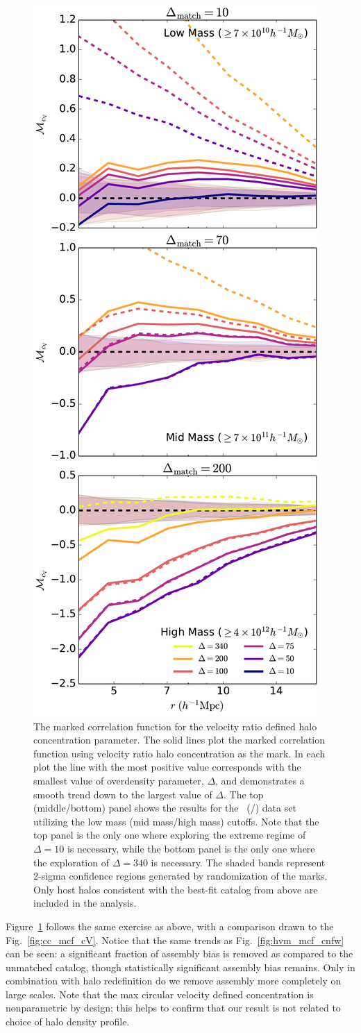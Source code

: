 \documentclass[usenatbib]{mnras}
\begin{document}
\begin{figure}
	\centering
	\includegraphics[width=.4\textwidth]{match_mcf_cV.pdf}
	\caption{The marked correlation function for the velocity ratio defined halo concentration parameter. The solid lines plot the marked correlation function using velocity ratio halo concentration as the mark. In each plot the line with the most 
positive value corresponds with the smallest value of overdensity parameter, 
$\Delta$, and demonstrates a smooth trend down to the largest value of 
$\Delta$. The top (middle/bottom) panel shows the results for the
\simA \ (\simB /\simC) data set utilizing the low mass (mid mass/high mass) cutoffs. Note
that the top panel is the only one where exploring the extreme regime of $\Delta = 10$ is
necessary, while the bottom panel is the only one where the exploration of $\Delta = 340$
is necessary. The shaded bands represent 2-sigma confidence regions generated by randomization of the marks. Only host halos consistent with the best-fit catalog from above are included in the analysis.}
	\label{fig:hvm_mcf_cV}
\end{figure}

Figure~\ref{fig:hvm_mcf_cV} follows the same exercise as above, with a comparison drawn to the Fig.~\ref{fig:cc_mcf_cV}. Notice that the same trends as Fig.~\ref{fig:hvm_mcf_cnfw} can be seen: a significant fraction of assembly bias is removed as compared to the unmatched catalog, though statistically significant assembly bias remains. Only in combination with halo redefinition do we remove assembly more completely on large scales. Note that the max circular velocity defined concentration is nonparametric by design; this helps to confirm that our result is not related to choice of halo density profile.
\end{document}
